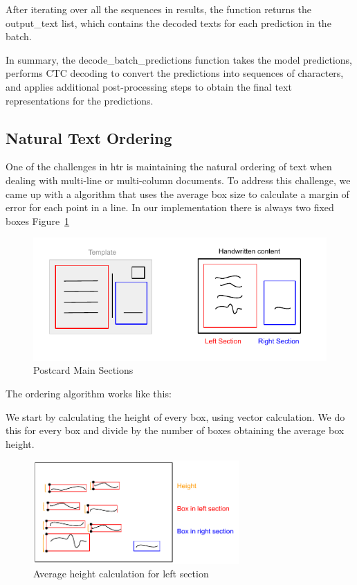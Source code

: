 After iterating over all the sequences in results, the function returns the output\_text list, which contains the decoded texts for each prediction in the batch.

In summary, the decode\_batch\_predictions function takes the model predictions, performs CTC decoding to convert the predictions into sequences of characters, and applies additional post-processing steps to obtain the final text representations for the predictions.


\subsection{Natural Text Ordering}
One of the challenges in \gls{htr} is maintaining the natural ordering of text when dealing with multi-line or multi-column documents. To address this challenge, we came up with a algorithm that uses the average box size to calculate a margin of error for each point in a line.
In our implementation there is always two fixed boxes Figure~\ref{fig:PFBoxes}

\begin{figure}[!ht]
	\centering
	\includegraphics[trim={0cm 0cm 0 0cm}, width=1\textwidth]{./Chapter5/Figures/Main Sections Postcard}
	\caption{Postcard Main Sections}
	\label{fig:PFBoxes}
\end{figure}

\newpage

The ordering algorithm works like this:

We start by calculating the height of every box, using vector calculation. We do this for every box and divide by the number of boxes obtaining the average box height.

\begin{figure}[!ht]
	\centering
	\includegraphics[trim={0cm -0.5cm 0 -0.5cm}, width=0.7\textwidth]{./Chapter5/Figures/Height Box}
	\caption{Average height calculation for left section}
	\label{fig:AVGH}
\end{figure}


